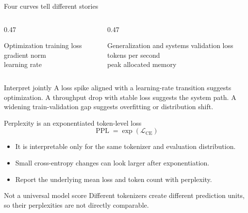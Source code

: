 \documentclass[handout]{beamer}
\begin{document}
\begin{frame}{Four curves tell different stories}
  \begin{columns}[t]
    \begin{column}{0.47\linewidth}
      \begin{block}{Optimization}
        training loss\\gradient norm\\learning rate
      \end{block}
    \end{column}
    \begin{column}{0.47\linewidth}
      \begin{block}{Generalization and systems}
        validation loss\\tokens per second\\peak allocated memory
      \end{block}
    \end{column}
  \end{columns}
  \begin{alertblock}{Interpret jointly}
    A loss spike aligned with a learning-rate transition suggests optimization. A throughput drop with stable loss suggests the system path. A widening train-validation gap suggests overfitting or distribution shift.
  \end{alertblock}
\end{frame}

\begin{frame}{Perplexity is an exponentiated token-level loss}
  \[
    \operatorname{PPL}=\exp(\mathcal{L}_{\text{CE}})
  \]
  \begin{itemize}
    \setlength{\itemsep}{8pt}
    \item It is interpretable only for the same tokenizer and evaluation distribution.
    \item Small cross-entropy changes can look larger after exponentiation.
    \item Report the underlying mean loss and token count with perplexity.
  \end{itemize}
  \begin{alertblock}{Not a universal model score}
    Different tokenizers create different prediction units, so their perplexities are not directly comparable.
  \end{alertblock}
\end{frame}
\end{document}
